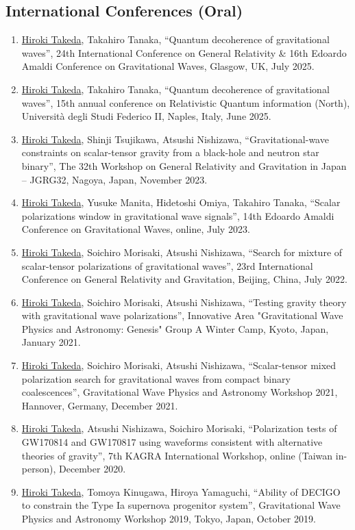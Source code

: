 \documentclass[uplatex, 12pt]{article}
\begin{document}
\subsection*{International Conferences (Oral)}
\begin{enumerate}
\item \uline{Hiroki Takeda}, Takahiro Tanaka, “Quantum decoherence of gravitational waves”, 24th International Conference on General Relativity 
& 16th Edoardo Amaldi Conference on Gravitational Waves, Glasgow, UK, July 2025.
\item \uline{Hiroki Takeda}, Takahiro Tanaka, “Quantum decoherence of gravitational waves”, 15th annual conference on Relativistic Quantum information (North),
Università degli Studi Federico II, Naples, Italy, June 2025.
\item \uline{Hiroki Takeda}, Shinji Tsujikawa, Atsushi Nishizawa, “Gravitational-wave constraints on scalar-tensor gravity from a black-hole and neutron star binary”, The 32th Workshop on General Relativity and Gravitation in Japan – JGRG32, Nagoya, Japan, November 2023.
\item \uline{Hiroki Takeda}, Yusuke Manita, Hidetoshi Omiya, Takahiro Tanaka, “Scalar polarizations window in gravitational wave signals”, 14th Edoardo Amaldi Conference on Gravitational Waves, online, July 2023.
\item \uline{Hiroki Takeda}, Soichiro Morisaki, Atsushi Nishizawa, “Search for mixture of scalar-tensor polarizations of gravitational waves”, 23rd International Conference on General Relativity and Gravitation, Beijing, China, July 2022.
\item \uline{Hiroki Takeda}, Soichiro Morisaki, Atsushi Nishizawa, “Testing gravity theory with gravitational wave polarizations”, Innovative Area "Gravitational Wave Physics and Astronomy: Genesis" Group A Winter Camp, Kyoto, Japan, January 2021.
\item \uline{Hiroki Takeda}, Soichiro Morisaki, Atsushi Nishizawa, “Scalar-tensor mixed polarization search for gravitational waves from compact binary coalescences”, Gravitational Wave Physics and Astronomy Workshop 2021, Hannover, Germany, December 2021.
\item \uline{Hiroki Takeda}, Atsushi Nishizawa, Soichiro Morisaki, “Polarization tests of GW170814 and GW170817 using waveforms consistent with alternative theories of gravity”, 7th KAGRA International Workshop, online (Taiwan in-person), December 2020.
\item \uline{Hiroki Takeda}, Tomoya Kinugawa, Hiroya Yamaguchi, “Ability of DECIGO to constrain the Type Ia supernova progenitor system”, Gravitational Wave Physics and Astronomy Workshop 2019, Tokyo, Japan, October 2019.

\end{enumerate}
\end{document}

